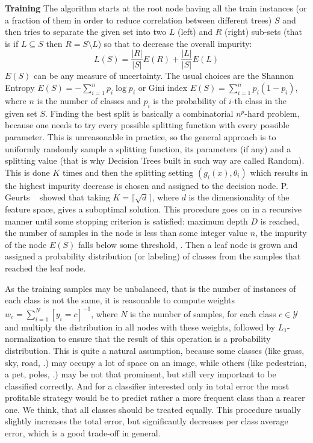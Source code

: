 {\bf Training} \quad The algorithm starts at the root node having all the train
instances (or a fraction of them in order to reduce correlation between
different trees) $ S $ and then tries to separate the given set into two $ L $
(left) and $ R $ (right) sub-sets (that is if $ L \subseteq S $ then $ R = S \setminus L $) so that to decrease the overall impurity:
\begin{equation}
 L(S) = \frac{\lvert R \rvert}{\lvert S \rvert} E(R) + \frac{\lvert L
\rvert}{\lvert S \rvert} E(L) \label{deacrese_impurity}
\end{equation}
$E(S)$ can be any measure of uncertainty. The usual choices are the Shannon
Entropy $ E(S) = -\sum_{i=1}^{n} p_i \log p_i $ or Gini index $ E(S) =
\sum_{i=1}^{n} p_i(1 - p_i) $, where $ n $ is the number of classes and $ p_i $
is the probability of $ i $-th class in the given set $ S $. Finding the best
split is basically a combinatorial $ n^p $-hard problem, because one needs to
try every possible splitting function with every possible parameter. This is
unreasonable in practice, so the general approach is to uniformly randomly
sample a splitting function, its parameters (if any) and a splitting value (that
is why Decision Trees built in such way are called Random). This is done $ K $
times and then the splitting setting $ (g_i(x), \theta_i) $ which results in the
highest impurity decrease is chosen and assigned to the decision node. P. Geurts
\etal~\cite{Geurts2006} showed that taking $ K = \lceil\sqrt{d}\rceil $, where $ d $ 
is the dimensionality of the feature
space, gives a suboptimal solution. This procedure goes on in a recursive manner
until some stopping criterion is satisfied: maximum depth $ D $ is reached, the
number of samples in the node is less than some integer value $ n $, the
impurity of the node $ E(S) $ falls below some threshold, \etc. Then a leaf node
is grown and assigned a probability distribution (or labeling) of classes from
the samples that reached the leaf node.

As the training samples may be unbalanced, that is
the number of instances of each class is not the same, it is reasonable to compute weights
$ w_c = {\sum_{i=1}^{N}[y_i = c]}^{-1} $, where $ N $ is the number of samples,
for each class $ c \in \mathcal{Y} $ and multiply the 
distribution in all nodes with these weights, followed by $L_1$-normalization to ensure that
the result of this operation is a probability distribution. 
This is quite a natural assumption, because some classes (like grass, sky, road, \etc.) may occupy
a lot of space on an image, while others (like pedestrian, a pet, poles, \etc.) may be not that prominent,
but still very important to be classified correctly. And for a classifier interested only in total error
the most profitable strategy would be to predict rather a more frequent class than a rearer one. We think, 
that all classes should be treated equally.
This procedure usually slightly increases the total error, but significantly decreases per 
class average error, which is a good trade-off in general. 

